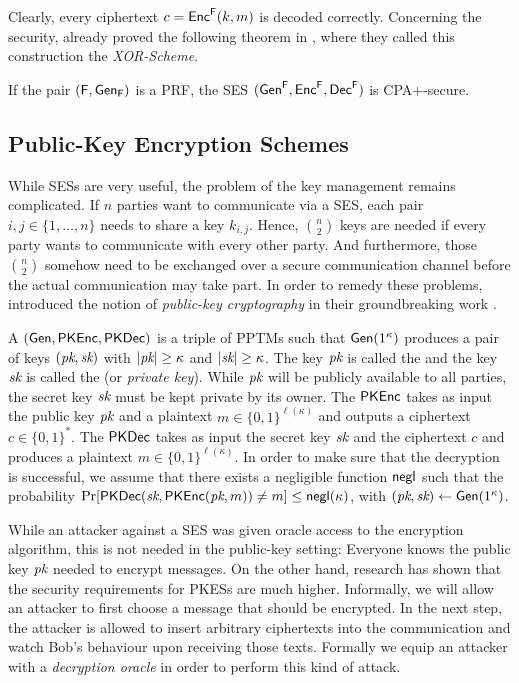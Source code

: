 Clearly, every ciphertext $c=\operatorname{\mathsf{Enc}}^{\operatorname{\mathsf{F}}}(k,m)$ is decoded correctly. Concerning
the security, \citeauthor{bellare1997concrete} already proved the
following theorem in \cite{bellare1997concrete}, where they called this
construction the \emph{XOR-Scheme}.

\begin{theorem}
  If the pair $(\operatorname{\mathsf{F}},\operatorname{\mathsf{Gen}}_{\operatorname{\mathsf{F}}})$ is a \acl{PRF}, the \acl{SES}
  $(\operatorname{\mathsf{Gen}}^{\operatorname{\mathsf{F}}},\operatorname{\mathsf{Enc}}^{\operatorname{\mathsf{F}}},\operatorname{\mathsf{Dec}}^{\operatorname{\mathsf{F}}})$ is \ac{CPA+}-secure.
\end{theorem}

\subsection*{Public-Key Encryption Schemes}
While \acp{SES} are very useful, the problem of the key management
remains complicated. If $n$ parties want to communicate via a \ac{SES},
each pair $i,j\in \{1,\ldots,n\}$ needs to share a key $k_{i,j}$. Hence,
$\binom{n}{2}$ keys are needed if every party wants to communicate with
every other party. And furthermore, those $\binom{n}{2}$ somehow need to
be exchanged over a secure communication channel before the actual
communication may take part. In order to remedy these problems,
\citeauthor{diffie1976publickey} introduced the notion of
\emph{public-key cryptography} in their groundbreaking work
\cite{diffie1976publickey}. 

A  $(\operatorname{\mathsf{Gen}},\operatorname{\mathsf{PKEnc}},\operatorname{\mathsf{PKDec}})$ is a triple of \acp{PPTM}
such that $\operatorname{\mathsf{Gen}}(1^{\kappa})$ produces a pair of keys $(\textit{pk},\textit{sk})$ with
$|\textit{pk}|\geq \kappa$ and $|\textit{sk}|\geq \kappa$. The key $\textit{pk}$ is called the
 and the key $\textit{sk}$ is called the 
(or \emph{private key}). While $\textit{pk}$ will be publicly available to all
parties, the secret key $\textit{sk}$ must be kept private by its owner. The
 $\operatorname{\mathsf{PKEnc}}$ takes as input the
public key $\textit{pk}$ and a plaintext $m\in \{0,1\}^{\ell(\kappa)}$ and
outputs a ciphertext $c\in \{0,1\}^{*}$. The  $\operatorname{\mathsf{PKDec}}$ takes as input the secret key $\textit{sk}$ and the
ciphertext $c$ and produces a plaintext $m\in
\{0,1\}^{\ell(\kappa)}$. In order to make sure that the decryption
is successful, we assume that there exists a negligible function $\operatorname{\mathsf{negl}}$
such that the probability
$\Pr[\operatorname{\mathsf{PKDec}}(\textit{sk},\operatorname{\mathsf{PKEnc}}(\textit{pk},m))\neq m]\leq\operatorname{\mathsf{negl}}(\kappa)$, with
$(\textit{pk},\textit{sk})\gets \operatorname{\mathsf{Gen}}(1^{\kappa})$. 

While an attacker against a \ac{SES} was given oracle access to the
encryption algorithm, this is not needed in the public-key setting:
Everyone knows the public key $\textit{pk}$ needed to encrypt messages. On the
other hand, research has shown that the security requirements for
\acp{PKES} are much higher. Informally, we will allow an attacker to
first choose a message that should be encrypted. In the next step, the
attacker is allowed to insert arbitrary ciphertexts into the
communication and watch Bob's behaviour upon receiving those
texts. Formally we equip an attacker with a
\emph{decryption oracle} in order to perform this kind of attack. 

